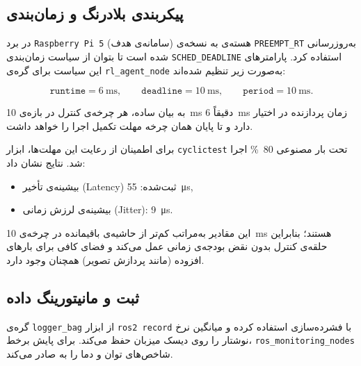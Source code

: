 %	
\subsection{پیکربندی بلادرنگ و زمان‌بندی}\label{subsec:ros2_rt}

در برد \texttt{Raspberry Pi 5} (سامانه‌ی هدف) هسته‌ی  به نسخه‌ی \texttt{PREEMPT\_RT} به‌روزرسانی شده است تا بتوان از سیاست زمان‌بندی \texttt{SCHED\_DEADLINE} استفاده کرد. پارامترهای این سیاست برای گره‌ی \texttt{rl\_agent\_node} به‌صورت زیر تنظیم شده‌اند:

\[
\texttt{runtime}= \SI{6}{\milli\second}, \qquad
\texttt{deadline}= \SI{10}{\milli\second}, \qquad
\texttt{period}= \SI{10}{\milli\second}.
\]

به بیان ساده، هر چرخه‌ی کنترل در بازه‌ی \SI{10}{\milli\second} دقیقاً \SI{6}{\milli\second} زمان پردازنده در اختیار دارد و تا پایان همان چرخه مهلت تکمیل اجرا را خواهد داشت.

برای اطمینان از رعایت این مهلت‌ها، ابزار \texttt{cyclictest} تحت بار مصنوعی \SI{80}{\percent} اجرا شد. نتایج نشان داد:

\begin{itemize}
	\item بیشینه‌ی تأخیر (Latency) ثبت‌شده: \SI{55}{\micro\second},
	\item بیشینه‌ی لرزش زمانی (Jitter): \SI{9}{\micro\second}.
\end{itemize}

این مقادیر به‌مراتب کم‌تر از حاشیه‌ی باقیمانده در چرخه‌ی \SI{10}{\milli\second} هستند؛ بنابراین حلقه‌ی کنترل بدون نقض بودجه‌ی زمانی عمل می‌کند و فضای کافی برای بارهای افزوده (مانند پردازش تصویر) همچنان وجود دارد.

	
	\subsection{ثبت و مانیتورینگ داده}\label{subsec:ros2_logging}
	گره‌ی \texttt{logger\_bag} از ابزار \texttt{ros2 record} با فشرده‌سازی  استفاده کرده و میانگین نرخ نوشتار
	  را روی دیسک  میزبان حفظ می‌کند. برای پایش برخط، \texttt{ros\_monitoring\_nodes} شاخص‌های توان و دما را به  صادر می‌کند.
	
